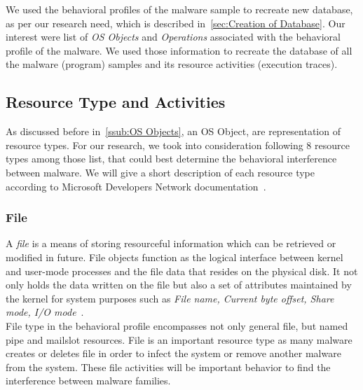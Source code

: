 We used the behavioral profiles of the malware sample to recreate new database, as per our research need, which is described in~\autoref{sec:Creation of Database}.
Our interest were list of \emph{OS Objects} and \emph{Operations} associated with the behavioral profile of the malware.
We used those information to recreate the database of all the malware (program) samples and its resource activities (execution traces).
\subsection{Resource Type and Activities}
\label{sub:Resource Types and Activities}
As discussed before in~\autoref{ssub:OS Objects}, an OS Object, are representation of resource types.
For our research, we took into consideration following 8 resource types among those list, that could best determine the behavioral interference between malware.
We will give a short description of each resource type according to Microsoft Developers Network documentation~\cite[MSDN]{msdn}.
\subsubsection{File}
\label{ssub:File}
A \emph{file} is a means of storing resourceful information which can be retrieved or modified in future.
File objects function as the logical interface between kernel and user-mode processes and the file data that resides on the physical disk.
It not only holds the data written on the file but also a set of attributes maintained by the kernel for system purposes such as \emph{File name, Current byte offset, Share mode, I/O mode}~\cite[]{msfile}.\\
File type in the behavioral profile encompasses not only general file, but named pipe and mailslot resources.
File is an important resource type as many malware creates or deletes file in order to infect the system or remove another malware from the system.
These file activities will be important behavior to find the interference between malware families.
